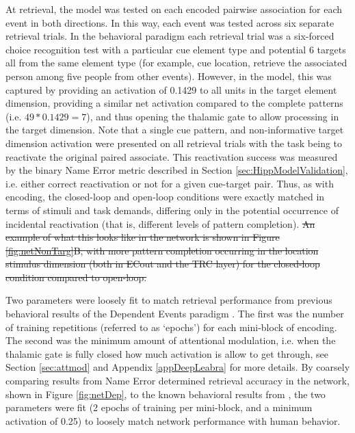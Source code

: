 \documentclass[11pt, titlepage, twoside]{article}
\providecommand{\DIFdel}[1]{{\protect\color{red}\sout{#1}}}                      %
\providecommand{\DIFdelbegin}{} %
\providecommand{\DIFdelend}{} %
\begin{document}
At retrieval, the model was tested on each encoded pairwise association for each event in both directions.  In this way, each event was tested across six separate retrieval trials.  In the behavioral paradigm each retrieval trial was a six-forced choice recognition test with a particular cue element type and potential 6 targets all from the same element type (for example, cue location, retrieve the associated person among five people from other events).  However, in the model, this was captured by providing an activation of 0.1429 to all units in the target element dimension, providing a similar net activation compared to the complete patterns (i.e. $49 * 0.1429=7$), and thus opening the thalamic gate to allow processing in the target dimension. Note that a single cue pattern, and non-informative target dimension activation were presented on all retrieval trials with the task being to reactivate the original paired associate.  This reactivation success was measured by the binary Name Error metric described in Section \ref{sec:HippModelValidation}, i.e. either correct reactivation or not for a given cue-target pair. Thus, as with encoding, the closed-loop and open-loop conditions were exactly matched in terms of stimuli and task demands, differing only in the potential occurrence of incidental reactivation (that is, different levels of pattern completion).  
\DIFdelbegin \DIFdel{An example of what this looks like in the network is shown in Figure \ref{fig:netNonTarg}B, with more pattern completion occurring in the location stimulus dimension (both in ECout and the TRC layer) for the closed-loop condition compared to open-loop.
}\DIFdelend %

Two parameters were loosely fit to match retrieval performance from previous behavioral results of the Dependent Events paradigm \cite{HornerBisbyBushEtAl15,HornerBurgess14}.  The first was the number of training repetitions (referred to as `epochs') for each mini-block of encoding.  The second was the minimum amount of attentional modulation, i.e. when the thalamic gate is fully closed how much activation is allow to get through, see Section \ref{sec:attmod} and Appendix \ref{appDeepLeabra} for more details.  By coarsely comparing results from Name Error determined retrieval accuracy in the network, shown in Figure \ref{fig:netDep}, to the known behavioral results from \textcite{HornerBisbyBushEtAl15,HornerBurgess14}, the two parameters were fit (2 epochs of training per mini-block, and a minimum activation of 0.25) to loosely match network performance with human behavior.
\end{document}
